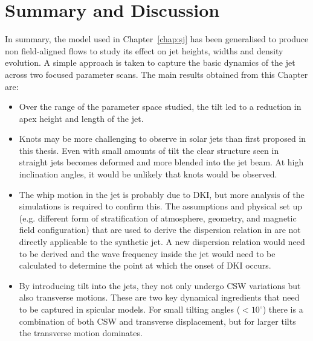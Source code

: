 \documentclass[12pt]{ociamthesis}
\newcommand{\Alfven}{Alfv\'{e}n }
\newcommand{\degs}{^{\circ}}
\begin{document}
\section{Summary and Discussion}
\label{sec:sum}
In summary, the model used in Chapter~\ref{chap:sj} has been generalised to produce non field-aligned flows to study its effect on jet heights, widths and density evolution. A simple approach is taken to capture the basic dynamics of the jet across two focused parameter scans. The main results obtained from this Chapter are:   
\begin{itemize}
\item Over the range of the parameter space studied, the tilt led to a reduction in apex height and length of the jet.
\item Knots may be more challenging to observe in solar jets than first proposed in this thesis. Even with small amounts of tilt the clear structure seen in straight jets becomes deformed and more blended into the jet beam. At high inclination angles, it would be unlikely that knots would be observed. 
\item The whip motion in the jet is probably due to DKI, but more analysis of the simulations is required to confirm this. The assumptions and physical set up (e.g. different form of stratification of atmosphere, geometry, and magnetic field configuration) that are used to derive the dispersion relation in \cite{Zaqarashvili2020ApJ893L46Z} are not directly applicable to the synthetic jet. A new dispersion relation would need to be derived and the wave frequency inside the jet would need to be calculated to determine the point at which the onset of DKI occurs. 
\item By introducing tilt into the jets, they not only undergo CSW variations but also transverse motions. These are two key dynamical ingredients that need to be captured in spicular models. For small tilting angles ($<10\degs$) there is a combination of both CSW and transverse displacement, but for larger tilts the transverse motion dominates.
\end{itemize}
\end{document}
